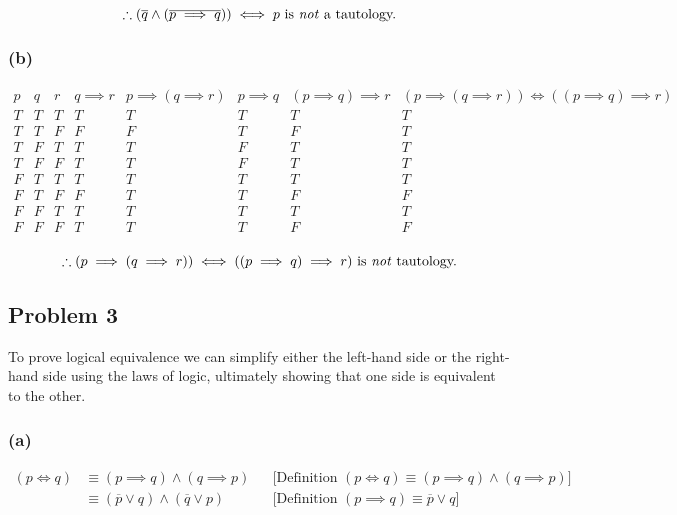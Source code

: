 \documentclass[10pt]{article}
\begin{document}
$$\therefore (\overline{q} \land (\overline{p \implies q})) \iff p \textrm{ is
  \emph{not} a tautology.}$$

\subsubsection*{(b)}

\begin{displaymath}
  \begin{array}{c|c|c|c|c|c|c|c}
    p & q & r & q \implies r & p \implies (q \implies r) & p \implies q & (p
    \implies q) \implies r & (p \implies (q \implies r)) \iff ((p \implies q)
    \implies r) \\
    \hline
    T & T & T & T & T & T & T & T \\
    T & T & F & F & F & T & F & T \\
    T & F & T & T & T & F & T & T \\
    T & F & F & T & T & F & T & T \\
    F & T & T & T & T & T & T & T \\
    F & T & F & F & T & T & F & F \\
    F & F & T & T & T & T & T & T \\
    F & F & F & T & T & T & F & F \\
  \end{array}
\end{displaymath}

$$\therefore (p \implies (q \implies r)) \iff ((p \implies q) \implies r)
\textrm{ is \emph{not} tautology.}$$

\newpage
\subsection*{Problem 3}

To prove logical equivalence we can simplify either the left-hand side or the
right-hand side using the laws of logic, ultimately showing that one side is
equivalent to the other.

\subsubsection*{(a)}

\begin{align*}
  (p \iff q) &\equiv (p \implies q) \land (q \implies p) && \text{[Definition }
  (p \iff q) \equiv (p \implies q) \land (q \implies p)] \\
    &\equiv (\overline{p} \lor q) \land (\overline{q} \lor p) && \text{[Definition }
    (p \implies q) \equiv \overline{p} \lor q]
\end{align*}
\end{document}
